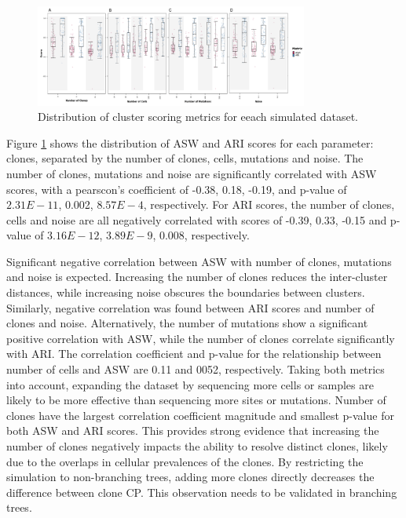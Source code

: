 \documentclass{article}
\begin{document}
\begin{figure}[!ht]\centering\includegraphics[width=0.8\textwidth]{fig/stat.png}
    \caption{\label{fig:stat} Distribution of cluster scoring metrics for eeach simulated dataset.}      
\end{figure}

Figure \ref{fig:stat} shows the distribution of ASW and ARI scores for each parameter: clones, separated by the number of clones, cells, mutations and noise. The number of clones, mutations and noise are significantly correlated with ASW scores, with a pearscon's coefficient of -0.38, 0.18, -0.19, and p-value of $2.31E-11$, 0.002, $8.57E-4$, respectively. For ARI scores, the number of clones, cells and noise are all negatively correlated with scores of -0.39, 0.33, -0.15 and p-value of $3.16E-12$, $3.89E-9$, 0.008, respectively.

Significant negative correlation between ASW with number of clones, mutations and noise is expected. Increasing the number of clones reduces the inter-cluster distances, while increasing noise obscures the boundaries between clusters. Similarly, negative correlation was found between ARI scores and number of clones and noise. Alternatively, the number of mutations show a significant positive correlation with ASW, while the number of clones correlate significantly with ARI. The correlation coefficient and p-value for the relationship between number of cells and ASW are 0.11 and 0052, respectively. Taking both metrics into account, expanding the dataset by sequencing more cells or samples are likely to be more effective than sequencing more sites or mutations. Number of clones have the largest correlation coefficient magnitude and smallest p-value for both ASW and ARI scores. This provides strong evidence that increasing the number of clones negatively impacts the ability to resolve distinct clones, likely due to the overlaps in cellular prevalences of the clones. By restricting the simulation to non-branching trees, adding more clones directly decreases the difference between clone CP. This observation needs to be validated in branching trees.
\end{document}
